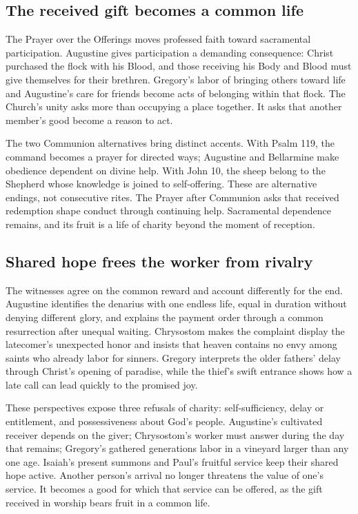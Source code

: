 \subsection*{The received gift becomes a common life}
The Prayer over the Offerings moves professed faith toward sacramental
participation. Augustine gives participation a demanding consequence: Christ
purchased the flock with his Blood, and those receiving his Body and Blood
must give themselves for their brethren. Gregory's labor of bringing others
toward life and Augustine's care for friends become acts of belonging within
that flock. The Church's unity asks more than occupying a place together. It
asks that another member's good become a reason to act.

The two Communion alternatives bring distinct accents. With Psalm 119, the
command becomes a prayer for directed ways; Augustine and Bellarmine make
obedience dependent on divine help. With John 10, the sheep belong to the
Shepherd whose knowledge is joined to self-offering. These are alternative
endings, not consecutive rites. The Prayer after Communion asks that received
redemption shape conduct through continuing help. Sacramental dependence
remains, and its fruit is a life of charity beyond the moment of reception.

\subsection*{Shared hope frees the worker from rivalry}
The witnesses agree on the common reward and account differently for the end.
Augustine identifies the denarius with one endless life, equal in duration
without denying different glory, and explains the payment order through a
common resurrection after unequal waiting. Chrysostom makes the complaint
display the latecomer's unexpected honor and insists that heaven contains no
envy among saints who already labor for sinners. Gregory interprets the older
fathers' delay through Christ's opening of paradise, while the thief's swift
entrance shows how a late call can lead quickly to the promised joy.

These perspectives expose three refusals of charity: self-sufficiency, delay
or entitlement, and possessiveness about God's people. Augustine's cultivated
receiver depends on the giver; Chrysostom's worker must answer during the day
that remains; Gregory's gathered generations labor in a vineyard larger than
any one age. Isaiah's present summons and Paul's fruitful service keep their
shared hope active. Another person's arrival no longer threatens the value of
one's service. It becomes a good for which that service can be offered, as the
gift received in worship bears fruit in a common life.
\par
{}
